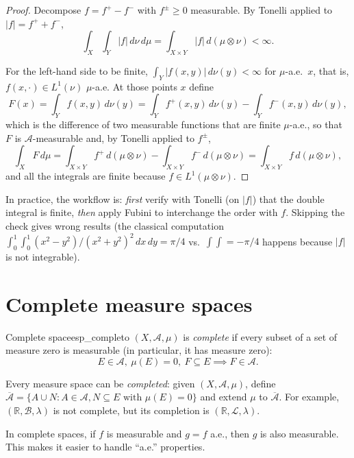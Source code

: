 \documentclass[11pt, a4paper]{article}
\begin{document}
\begin{proof}
Decompose $f = f^+ - f^-$ with $f^\pm \ge 0$ measurable. By Tonelli applied to $|f| = f^+ + f^-$,
$$ \int_X \!\int_Y |f| \, d\nu \, d\mu = \int_{X \times Y} |f| \, d(\mu \otimes \nu) < \infty. $$

For the left-hand side to be finite, $\int_Y |f(x, y)| \, d\nu(y) < \infty$ for $\mu$-a.e.\
$x$, that is, $f(x, \cdot) \in L^1(\nu)$ $\mu$-a.e. At those points $x$ define
$$ F(x) = \int_Y f(x, y) \, d\nu(y) = \int_Y f^+(x, y) \, d\nu(y) - \int_Y f^-(x, y) \, d\nu(y), $$
which is the difference of two measurable functions that are finite $\mu$-a.e., so that $F$ is
$\mathcal{A}$-measurable and, by Tonelli applied to $f^\pm$,
$$ \int_X F \, d\mu = \int_{X \times Y} f^+ \, d(\mu \otimes \nu) - \int_{X \times Y} f^- \,
d(\mu \otimes \nu) = \int_{X \times Y} f \, d(\mu \otimes \nu), $$
and all the integrals are finite because $f \in L^1(\mu \otimes \nu)$.
\end{proof}

\obs In practice, the workflow is: \textit{first} verify with Tonelli (on $|f|$) that the
double integral is finite, \textit{then} apply Fubini to interchange the order with $f$.
Skipping the check gives wrong results (the classical computation
$\int_0^1 \int_0^1 (x^2 - y^2)/(x^2 + y^2)^2 \, dx \, dy = \pi/4$ vs.\ $\int \int = -\pi/4$ happens
because $|f|$ is not integrable).

\newpage

\section{Complete measure spaces}

\begin{definicion}{Complete space}{esp_completo}
$(X, \mathcal{A}, \mu)$ is \emph{complete} if every subset of a set of measure zero is
measurable (in particular, it has measure zero):
$$ E \in \mathcal{A}, \ \mu(E) = 0, \ F \subseteq E \implies F \in \mathcal{A}. $$
\end{definicion}

\obs Every measure space can be \emph{completed}: given $(X, \mathcal{A}, \mu)$, define
$\overline{\mathcal{A}} = \{A \cup N : A \in \mathcal{A}, N \subseteq E \text{ with } \mu(E) = 0\}$
and extend $\mu$ to $\overline{\mathcal{A}}$. For example, $(\mathbb{R}, \mathcal{B}, \lambda)$
is not complete, but its completion is $(\mathbb{R}, \mathcal{L}, \lambda)$.

\obs In complete spaces, if $f$ is measurable and $g = f$ a.e., then $g$ is also measurable.
This makes it easier to handle ``a.e.'' properties.
\end{document}
